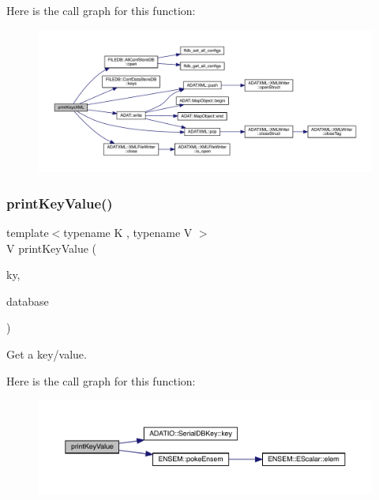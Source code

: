 Here is the call graph for this function\+:
\nopagebreak
\begin{figure}[H]
\begin{center}
\leavevmode
\includegraphics[width=350pt]{d5/d55/adat-devel_2main_2dbutil_2dbutil_8cc_a44428d59560cb466420c5c0ca60315e5_cgraph}
\end{center}
\end{figure}
\mbox{\label{adat-devel_2main_2dbutil_2dbutil_8cc_a1c5a310406bc62a92190de39689f1005}} 
\subsubsection{\texorpdfstring{printKeyValue()}{printKeyValue()}}
{\footnotesize\ttfamily template$<$typename K , typename V $>$ \\
V print\+Key\+Value (\begin{DoxyParamCaption}\item[{const K \&}]{ky,  }\item[{\mbox{\hyperlink{classFILEDB_1_1AllConfStoreDB}{All\+Conf\+Store\+DB}}$<$ \mbox{\hyperlink{classADATIO_1_1SerialDBKey}{Serial\+D\+B\+Key}}$<$ K $>$, \mbox{\hyperlink{classADATIO_1_1SerialDBData}{Serial\+D\+B\+Data}}$<$ typename \mbox{\hyperlink{structENSEM_1_1EnsemScalar}{Ensem\+Scalar}}$<$ V $>$\+::Type\+\_\+t $>$ $>$ \&}]{database }\end{DoxyParamCaption})}



Get a key/value. 

Here is the call graph for this function\+:
\nopagebreak
\begin{figure}[H]
\begin{center}
\leavevmode
\includegraphics[width=350pt]{d5/d55/adat-devel_2main_2dbutil_2dbutil_8cc_a1c5a310406bc62a92190de39689f1005_cgraph}
\end{center}
\end{figure}
\mbox{\label{adat-devel_2main_2dbutil_2dbutil_8cc_a562fa6116f55a7f0dbfe8ca08e136460}} 
